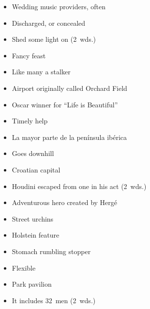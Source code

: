 {\begin{itemize}
      \item
        Wedding music providers, often
      \item
        Discharged, or concealed
    \end{itemize}
  \item
    \begin{itemize}
      \item
        Shed some light on (2~wds.)
      \item
        Fancy feast
    \end{itemize}
  \item
    \begin{itemize}
      \item
        Like many a stalker
      \item
        Airport originally called Orchard Field
    \end{itemize}
  \item
    \begin{itemize}
      \item
        Oscar winner for ``Life is Beautiful''
      \item
        Timely help
    \end{itemize}
  \item
    \begin{itemize}
      \item
        La mayor parte de la pen\'{i}nsula ib\'{e}rica
      \item
        Goes downhill
    \end{itemize}
  \item
    \begin{itemize}
      \item
        Croatian capital
      \item
        Houdini escaped from one in his act (2~wds.)
    \end{itemize}
}{%
  \item
    \begin{itemize}
      \item
        Adventurous hero created by Herg\'{e}
      \item
        Street urchins
      \item
        Holstein feature
      \item
        Stomach rumbling stopper
      \item
        Flexible
      \item
        Park pavilion
      \item
        It includes 32~men (2~wds.)

\end{itemize}}
